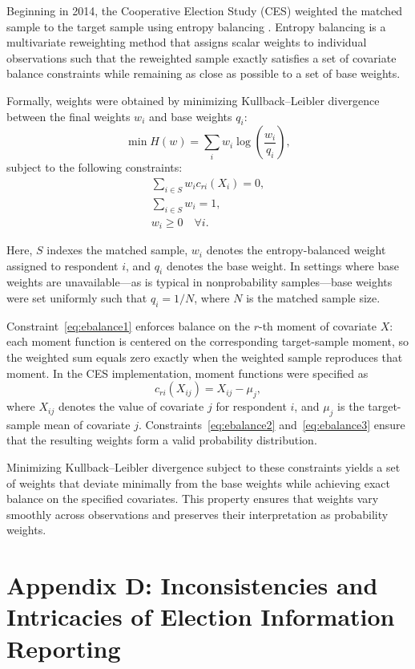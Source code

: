 \documentclass[12pt]{article}
\begin{document}
Beginning in 2014, the Cooperative Election Study (CES) weighted the matched sample to the target sample using entropy balancing \parencite{hainmueller_entropy_2012}. Entropy balancing is a multivariate reweighting method that assigns scalar weights to individual observations such that the reweighted sample exactly satisfies a set of covariate balance constraints while remaining as close as possible to a set of base weights.

Formally, weights were obtained by minimizing Kullback--Leibler divergence \parencite{kullback_information_1959} between the final weights \( w_i \) and base weights \( q_i \):
\[
\min H(w) = \sum_{i} w_{i} \log\!\left(\frac{w_{i}}{q_{i}}\right),
\]
subject to the following constraints:
\begin{gather}
    \sum_{i \in S} w_{i} c_{ri}(X_i) = 0, \label{eq:ebalance1} \\
    \sum_{i \in S} w_{i} = 1, \label{eq:ebalance2} \\
    w_{i} \ge 0 \quad \forall i. \label{eq:ebalance3}
\end{gather}

Here, \( S \) indexes the matched sample, \( w_i \) denotes the entropy-balanced weight assigned to respondent \( i \), and \( q_i \) denotes the base weight. In settings where base weights are unavailable—as is typical in nonprobability samples—base weights were set uniformly such that \( q_i = 1/N \), where \( N \) is the matched sample size.

Constraint~\eqref{eq:ebalance1} enforces balance on the \( r \)-th moment of covariate \( X \): each moment function is centered on the corresponding target-sample moment, so the weighted sum equals zero exactly when the weighted sample reproduces that moment. In the CES implementation, moment functions were specified as
\[
c_{ri}(X_{ij}) = X_{ij} - \mu_j,
\]
where \( X_{ij} \) denotes the value of covariate \( j \) for respondent \( i \), and \( \mu_j \) is the target-sample mean of covariate \( j \). Constraints~\eqref{eq:ebalance2} and~\eqref{eq:ebalance3} ensure that the resulting weights form a valid probability distribution.

Minimizing Kullback--Leibler divergence subject to these constraints yields a set of weights that deviate minimally from the base weights while achieving exact balance on the specified covariates. This property ensures that weights vary smoothly across observations and preserves their interpretation as probability weights.


\section*{Appendix D: Inconsistencies and Intricacies of Election Information Reporting}
{}
\label{app:inconsistencies_election_info}
\end{document}
